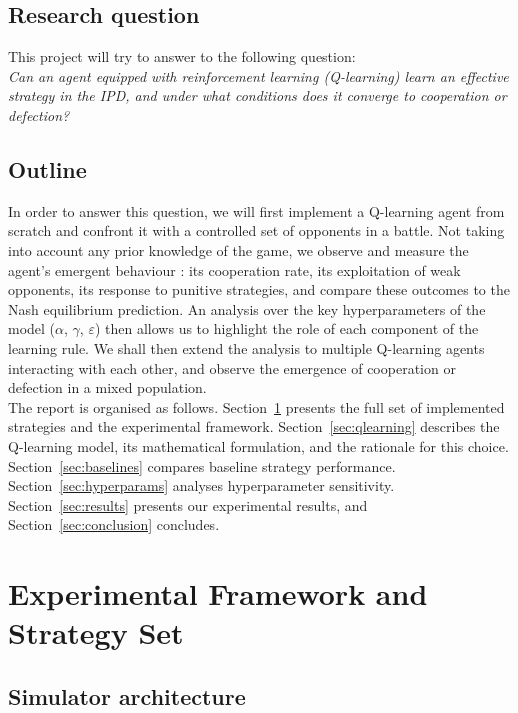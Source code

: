 \documentclass[11pt, a4paper]{article}
\begin{document}
\subsection{Research question}

This project will try to answer to the following question: \\

\textit{Can an agent equipped with reinforcement learning (Q-learning) learn an effective strategy in the IPD, and under what conditions does it converge to cooperation or defection?}

\subsection{Outline}
In order to answer this question, we will first implement a Q-learning agent from scratch and confront it with a controlled set of opponents in a battle. Not taking into account any prior knowledge of the game, we observe and measure the agent's emergent behaviour : its cooperation rate, its exploitation of weak opponents, its response to punitive strategies, and compare these outcomes to the Nash equilibrium prediction. An analysis over the key hyperparameters of the model ($\alpha$, $\gamma$, $\varepsilon$) then allows us to highlight the role of each component of the learning rule.
We shall then extend the analysis to multiple Q-learning agents interacting with each other, and observe the emergence of cooperation or defection in a mixed population.
\\

The report is organised as follows. Section~\ref{sec:strategies} presents the full set of implemented strategies and the experimental framework. Section~\ref{sec:qlearning} describes the Q-learning model, its mathematical formulation, and the rationale for this choice. Section~\ref{sec:baselines} compares baseline strategy performance. Section~\ref{sec:hyperparams} analyses hyperparameter sensitivity. Section~\ref{sec:results} presents our experimental results, and Section~\ref{sec:conclusion} concludes.

\newpage

\section{Experimental Framework and Strategy Set}
\label{sec:strategies}

\subsection{Simulator architecture}
\end{document}
